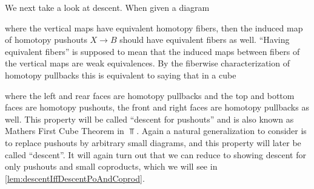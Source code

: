 We next take a look at descent.
When given a diagram 
\begin{center}
\end{center}
where the vertical maps have equivalent homotopy fibers, then the induced map of homotopy pushouts $X\to B$ should have equivalent fibers as well.
``Having equivalent fibers'' is supposed to mean that the induced maps between fibers of the vertical maps are weak equivalences.
By the fiberwise characterization of homotopy pullbacks this is equivalent to saying that in a cube 
\begin{center}
\end{center}
where the left and rear faces are homotopy pullbacks and the top and bottom faces are homotopy pushouts, the front and right faces are homotopy pullbacks as well.
This property will be called ``descent for pushouts'' and is also known as Mathers First Cube Theorem in $\Top$.
Again a natural generalization to consider is to replace pushouts by arbitrary small diagrams, and this property will later be called ``descent''.
It will again turn out that we can reduce to showing descent for only pushouts and small coproducts, which we will see in \cref{lem:descentIffDescentPoAndCoprod}.